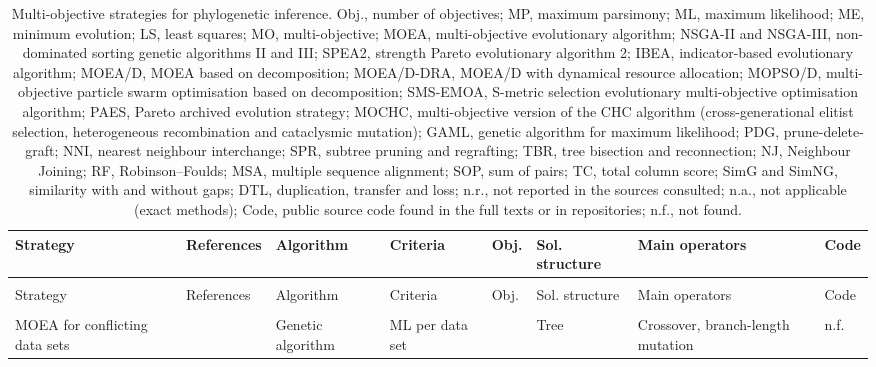 \begin{landscape}
{\scriptsize
\setlength{\tabcolsep}{4pt}
\setlength{\LTcapwidth}{\linewidth}
\begin{longtable}{>{\raggedright\arraybackslash}p{2.6cm}>{\raggedright\arraybackslash}p{2.0cm}>{\raggedright\arraybackslash}p{2.6cm}>{\raggedright\arraybackslash}p{2.6cm}>{\raggedright\arraybackslash}p{0.6cm}>{\raggedright\arraybackslash}p{2.1cm}>{\raggedright\arraybackslash}p{3.7cm}>{\raggedright\arraybackslash}p{0.8cm}}
\caption{Multi-objective strategies for phylogenetic inference. Obj., number of objectives; MP, maximum parsimony; ML, maximum likelihood; ME, minimum evolution; LS, least squares; MO, multi-objective; MOEA, multi-objective evolutionary algorithm; NSGA-II and NSGA-III, non-dominated sorting genetic algorithms II and III; SPEA2, strength Pareto evolutionary algorithm 2; IBEA, indicator-based evolutionary algorithm; MOEA/D, MOEA based on decomposition; MOEA/D-DRA, MOEA/D with dynamical resource allocation; MOPSO/D, multi-objective particle swarm optimisation based on decomposition; SMS-EMOA, S-metric selection evolutionary multi-objective optimisation algorithm; PAES, Pareto archived evolution strategy; MOCHC, multi-objective version of the CHC algorithm (cross-generational elitist selection, heterogeneous recombination and cataclysmic mutation); GAML, genetic algorithm for maximum likelihood; PDG, prune-delete-graft; NNI, nearest neighbour interchange; SPR, subtree pruning and regrafting; TBR, tree bisection and reconnection; NJ, Neighbour Joining; RF, Robinson--Foulds; MSA, multiple sequence alignment; SOP, sum of pairs; TC, total column score; SimG and SimNG, similarity with and without gaps; DTL, duplication, transfer and loss; n.r., not reported in the sources consulted; n.a., not applicable (exact methods); Code, public source code found in the full texts or in repositories; n.f., not found.}\label{tab:mo}\\
\toprule
Strategy & References & Algorithm & Criteria & Obj. & Sol. structure & Main operators & Code
\\
\midrule
\endfirsthead
\multicolumn{8}{l}{\emph{Table \ref{tab:mo} (continued)}}\\
\toprule
Strategy & References & Algorithm & Criteria & Obj. & Sol. structure & Main operators & Code
\\
\midrule
\endhead
\bottomrule
\endfoot
\multicolumn{8}{l}{\textit{Tree inference}}\\
MOEA for conflicting data sets & \cite{R00694,R04033} & Genetic algorithm & ML per data set & 2 & Tree & Crossover, branch-length mutation & n.f.\\

\end{longtable}}
\end{landscape}
